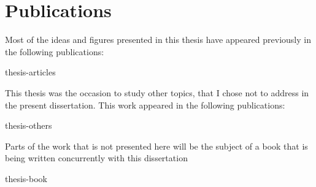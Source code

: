 

\chapter*{Publications} %

Most of the ideas and figures presented in this thesis have appeared previously in the following publications:

\smallskip


\begin{btSect}{thesis-articles}
\btPrintAll
\end{btSect}

\bigskip

This thesis was the occasion to study other topics, that I chose
not to address in the present dissertation. This work appeared in the following
publications:

\smallskip


\begin{btSect}{thesis-others}
\btPrintAll
\end{btSect}

\bigskip

Parts of the work that is not presented here will be the subject of a book that
is being written concurrently with this dissertation

\smallskip


\begin{btSect}{thesis-book}
\btPrintAll
\end{btSect}
